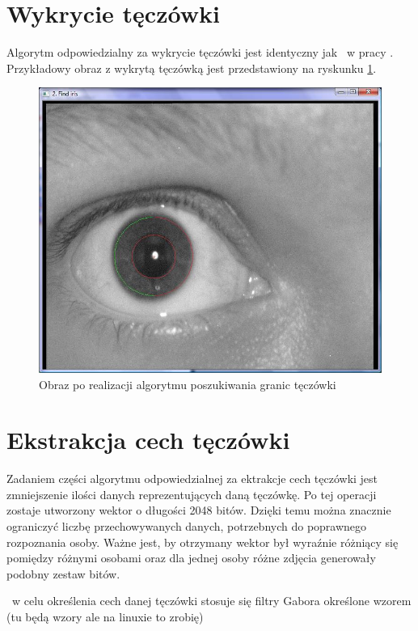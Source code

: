 \section{Wykrycie tęczówki}
\label{sec:wykrycieTeczowki}
Algorytm odpowiedzialny za wykrycie tęczówki jest identyczny jak ~w pracy \cite{Gl11}. Przykładowy obraz z wykrytą tęczówką jest przedstawiony na ryskunku \ref{fig:teczowkaNasza}.

\begin{figure}
\label{fig:teczowkaNasza}
\begin{center}
\includegraphics[scale=0.5]{teczowka.jpg}
\caption{Obraz po realizacji algorytmu poszukiwania granic tęczówki}
\end{center}
\end{figure}

\section{Ekstrakcja cech tęczówki}
\label{sec:ekstrakcja}
Zadaniem części algorytmu odpowiedzialnej za ektrakcje cech tęczówki jest zmniejszenie ilości danych reprezentujących daną tęczówkę. Po tej operacji zostaje utworzony wektor o długości 2048 bitów. Dzięki temu można znacznie ograniczyć liczbę przechowywanych danych, potrzebnych do poprawnego rozpoznania osoby. Ważne jest, by otrzymany wektor był wyraźnie różniący się pomiędzy różnymi osobami oraz dla jednej osoby różne zdjęcia generowały podobny zestaw bitów. 

~w celu określenia cech danej tęczówki stosuje się filtry Gabora określone wzorem (tu będą wzory ale na linuxie to zrobię)

